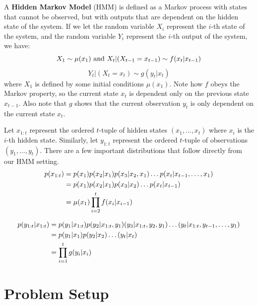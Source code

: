 \documentclass{article}
\begin{document}
A \textbf{Hidden Markov Model} (HMM) is defined as a Markov process with states that cannot be observed, but with outputs that are dependent on the hidden state of the system. If we let the random variable $X_i$ represent the $i$-th state of the system, and the random variable $Y_i$ represent the $i$-th output of the system, we have:
\begin{equation}
X_1 \sim \mu (x_1) \textnormal{ and } X_t|(X_{t-1}=x_{t-1}) \sim f(x_t|x_{t-1})
\end{equation}
\begin{equation}
Y_t|(X_t = x_t) \sim g(y_t|x_t)
\end{equation}
where $X_1$ is defined by some initial conditions $\mu(x_1)$. Note how $f$ obeys the Markov property, so the current state $x_t$ is dependent only on the previous state $x_{t-1}$. Also note that $g$ shows that the current observation $y_t$ is only dependent on the current state $x_t$.

Let $x_{1:t}$ represent the ordered $t$-tuple of hidden states $(x_1,\dots,x_t)$ where $x_i$ is the $i$-th hidden state. Similarly, let $y_{1:t}$ represent the ordered $t$-tuple of observations $(y_1,\dots,y_t)$. There are a few important distributions that follow directly from our HMM setting.
\begin{equation} \label{p(x_{1:t})}
\begin{split}
p(x_{1:t})
&= p(x_1)p(x_2|x_1)p(x_3|x_2,x_1)\dots p(x_t|x_{t-1},\dots,x_1)\\
&= p(x_1)p(x_2|x_1)p(x_3|x_2)\dots p(x_t|x_{t-1})\\
&=\mu(x_1)\prod_{i=2}^{t} f(x_i|x_{i-1})\\
\end{split}
\end{equation}

\begin{equation} \label{p(y_{1:t}|x_{1:t})}
\begin{split}
p(y_{1:t}|x_{1:t})
&= p(y_1|x_{1:t})p(y_2|x_{1:t},y_1)(y_3|x_{1:t},y_2,y_1)\dots (y_t|x_{1:t},y_{t-1},\dots,y_1)\\
&= p(y_1|x_1)p(y_2|x_2)\dots (y_t|x_t)\\
&= \prod_{i=1}^{t} g(y_i|x_i)\\
\end{split}
\end{equation}


\section{Problem Setup}
\end{document}
